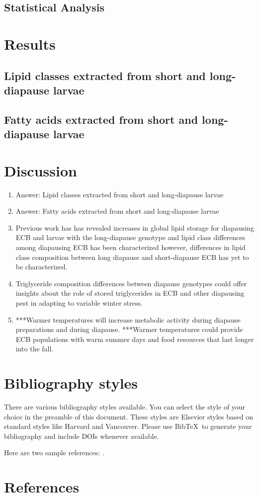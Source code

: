 \documentclass[review]{elsarticle}
\begin{document}
\subsection{Statistical Analysis}

\section{Results}
\subsection{Lipid classes extracted from short and long-diapause larvae}

\subsection{Fatty acids extracted from short and long-diapause larvae}

\section{Discussion}
\begin{enumerate}
    \item Answer: Lipid classes extracted from short and long-diapause larvae
    \item Answer: Fatty acids extracted from short and long-diapause larvae
    \item Previous work has has revealed increases in global lipid storage for diapausing ECB and larvae with the long-diapause genotype and lipid class differences among diapausing ECB has been characterized however, differences in lipid class composition between long diapause and short-diapause ECB has yet to be characterized.
    \item Triglyceride composition differences between diapause genotypes could offer insights about the role of stored triglycerides in ECB and other diapausing pest in adapting to variable winter stress.
    \item ***Warmer temperatures will increase metabolic activity during diapause preparations and during diapause. ***Warmer temperatures could provide ECB populations with warm summer days and food resources that last longer into the fall.
\end{enumerate}
\section{Bibliography styles}

There are various bibliography styles available. You can select the style of your choice in the preamble of this document. These styles are Elsevier styles based on standard styles like Harvard and Vancouver. Please use Bib\TeX\ to generate your bibliography and include DOIs whenever available.

Here are two sample references: \cite{Feynman1963118,Dirac1953888}.

\section*{References}


\end{document}
